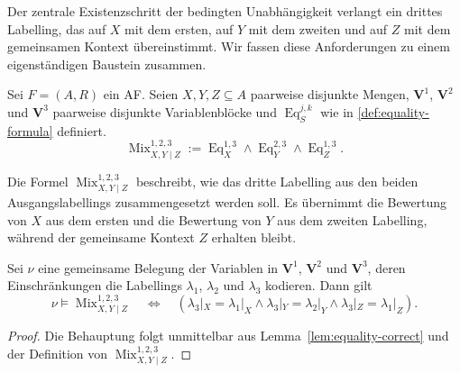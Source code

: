 Der zentrale Existenzschritt der bedingten Unabhängigkeit verlangt ein drittes Labelling, das auf \(X\) mit dem ersten, 
auf \(Y\) mit dem zweiten und auf \(Z\) mit dem gemeinsamen Kontext übereinstimmt. 
Wir fassen diese Anforderungen zu einem eigenständigen Baustein zusammen.
\begin{Definition}
\label{def:eq-mix-formula}
    Sei \(F =(A,R)\) ein AF. Seien \(X,Y,Z\subseteq A\) paarweise disjunkte Mengen, 
    \(\mathbf V^1\), \(\mathbf V^2\) und \(\mathbf V^3\) paarweise disjunkte Variablenblöcke 
    und \(\operatorname{Eq}^{j,k}_S\) wie in \ref{def:equality-formula} definiert.
    \[
        \operatorname{Mix}^{1,2,3}_{X,Y\mid Z}
        :=
        \operatorname{Eq}^{1,3}_X
        \land
        \operatorname{Eq}^{2,3}_Y
        \land
        \operatorname{Eq}^{1,3}_Z.
    \]
\end{Definition}
Die Formel \( \operatorname{Mix}^{1,2,3}_{X,Y\mid Z}\) beschreibt, wie das dritte Labelling aus 
den beiden Ausgangslabellings zusammengesetzt werden soll. Es übernimmt die Bewertung von \(X\) 
aus dem ersten und die Bewertung von \(Y\) aus dem zweiten Labelling, 
während der gemeinsame Kontext \(Z\) erhalten bleibt.
\begin{Lemma}
    \label{lem:mix-correct}
    Sei \(\nu\) eine gemeinsame Belegung der Variablen in
    \(\mathbf V^1\), \(\mathbf V^2\) und \(\mathbf V^3\), deren
    Einschränkungen die Labellings
    \(\lambda_1\), \(\lambda_2\) und \(\lambda_3\) kodieren. Dann gilt
    \[
        \nu\models\operatorname{Mix}^{1,2,3}_{X,Y\mid Z}
        \quad\Longleftrightarrow\quad
        \left(
            \lambda_3|_X=\lambda_1|_X
            \land
            \lambda_3|_Y=\lambda_2|_Y
            \land
            \lambda_3|_Z=\lambda_1|_Z
        \right).
    \]
\end{Lemma}
\begin{proof}
    Die Behauptung folgt unmittelbar aus
    Lemma~\ref{lem:equality-correct} und der Definition von
    \(\operatorname{Mix}^{1,2,3}_{X,Y\mid Z}\).
\end{proof}

